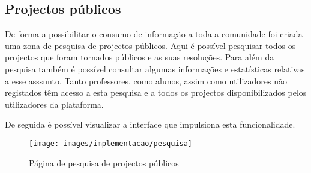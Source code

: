 \subsection{Projectos públicos}

De forma a possibilitar o consumo de informação a toda a comunidade foi criada uma zona de pesquisa de projectos públicos. Aqui é possível pesquisar todos os projectos que foram tornados públicos e as suas resoluções. Para além da pesquisa também é possível consultar algumas informações e estatísticas relativas a esse asssunto.
Tanto professores, como alunos, assim como utilizadores não registados têm acesso a esta pesquisa e a todos os projectos disponibilizados pelos utilizadores da plataforma.

De seguida é possível visualizar a interface que impulsiona esta funcionalidade.

\begin{figure}[H]
  \centering
  \texttt{[image: images/implementacao/pesquisa]}
  \caption{Página de pesquisa de projectos públicos}
  \label{fig:public_projects}
\end{figure}
